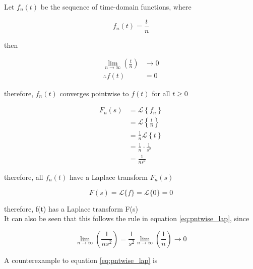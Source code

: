 \documentclass[a4paper,10pt,reqno]{amsart}
\numberwithin{equation}{section}
\newcommand{\lap}{\mathscr{L}}
\begin{document}
Let $f_n(t)$ be the sequence of time-domain functions, where

\begin{equation}
     f_n(t) = \frac{t}{n}
\end{equation}
\vspace{1pt}

then

\begin{subequations}
     \begin{align}
         \lim_{n \to \infty} \left(\frac{t}{n}\right) &\to 0 \\
         \therefore f(t) &= 0
     \end{align}
\end{subequations}
\vspace{1pt}

therefore, $f_n(t)$ converges pointwise to $f(t)$ for all $t\geq0$

\begin{subequations}
     \begin{align}
         F_n(s) &= \lap\left\{f_n\right\} \\
         &= \lap\left\{\frac{t}{n}\right\} \\
         &= \frac{1}{n} \lap\left\{t\right\} \\
         &= \frac{1}{n} \cdot \frac{1}{s^2} \\
         &= \frac{1}{ns^2}
    \end{align}
\end{subequations}
\vspace{1pt}

therefore, all $f_n(t)$ have a Laplace transform $F_n(s)$

\begin{equation}\label{eq:F}
     F(s) = \lap\{f\} = \lap\{0\} = 0
\end{equation}
\vspace{1pt}

therefore, f(t) has a Laplace transform F(s) \\

It can also be seen that this follows the rule in equation \ref{eq:pntwise_lap}, since

\begin{equation}
     \lim_{n \to \infty} \left(\frac{1}{ns^2}\right) = \frac{1}{s^2} \lim_{n \to \infty} \left(\frac{1}{n}\right) \to 0
\end{equation}
\vspace{1pt}

A counterexample to equation \ref{eq:pntwise_lap} is
\end{document}
